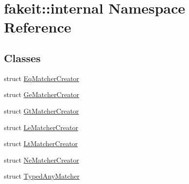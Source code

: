 \hypertarget{namespacefakeit_1_1internal}{}\section{fakeit\+::internal Namespace Reference}
\label{namespacefakeit_1_1internal}
\subsection*{Classes}
\begin{DoxyCompactItemize}
\item 
struct \mbox{\hyperlink{structfakeit_1_1internal_1_1EqMatcherCreator}{Eq\+Matcher\+Creator}}
\item 
struct \mbox{\hyperlink{structfakeit_1_1internal_1_1GeMatcherCreator}{Ge\+Matcher\+Creator}}
\item 
struct \mbox{\hyperlink{structfakeit_1_1internal_1_1GtMatcherCreator}{Gt\+Matcher\+Creator}}
\item 
struct \mbox{\hyperlink{structfakeit_1_1internal_1_1LeMatcherCreator}{Le\+Matcher\+Creator}}
\item 
struct \mbox{\hyperlink{structfakeit_1_1internal_1_1LtMatcherCreator}{Lt\+Matcher\+Creator}}
\item 
struct \mbox{\hyperlink{structfakeit_1_1internal_1_1NeMatcherCreator}{Ne\+Matcher\+Creator}}
\item 
struct \mbox{\hyperlink{structfakeit_1_1internal_1_1TypedAnyMatcher}{Typed\+Any\+Matcher}}
\end{DoxyCompactItemize}
